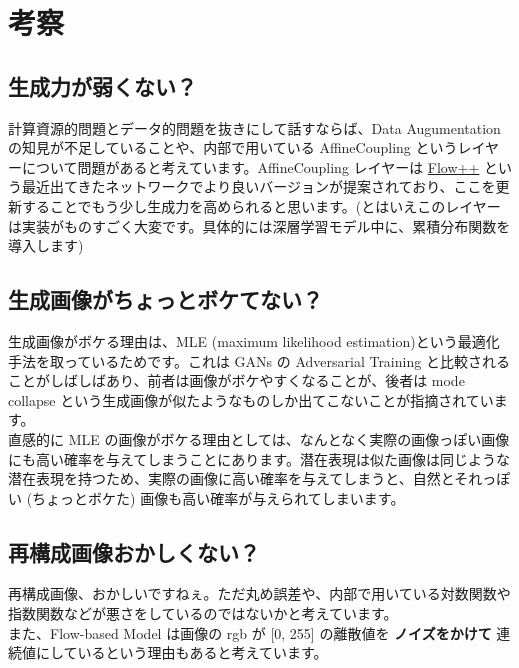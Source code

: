 \documentclass[dvipdfmx]{article}
\begin{document}
\section{考察}
\label{sec:org8e87b73}
\subsection{生成力が弱くない？}
\label{sec:org575711b}
計算資源的問題とデータ的問題を抜きにして話すならば、Data Augumentation の知見が不足していることや、内部で用いている AffineCoupling というレイヤーについて問題があると考えています。AffineCoupling レイヤーは \href{https://arxiv.org/pdf/1902.00275.pdf}{Flow++} という最近出てきたネットワークでより良いバージョンが提案されており、ここを更新することでもう少し生成力を高められると思います。(とはいえこのレイヤーは実装がものすごく大変です。具体的には深層学習モデル中に、累積分布関数を導入します)\\

\subsection{生成画像がちょっとボケてない？}
\label{sec:org31fdf4e}
生成画像がボケる理由は、MLE (maximum likelihood estimation)という最適化手法を取っているためです。これは GANs の Adversarial Training と比較されることがしばしばあり、前者は画像がボケやすくなることが、後者は mode collapse という生成画像が似たようなものしか出てこないことが指摘されています。\\

直感的に MLE の画像がボケる理由としては、なんとなく実際の画像っぽい画像にも高い確率を与えてしまうことにあります。潜在表現は似た画像は同じような潜在表現を持つため、実際の画像に高い確率を与えてしまうと、自然とそれっぽい (ちょっとボケた) 画像も高い確率が与えられてしまいます。\\

\subsection{再構成画像おかしくない？}
\label{sec:orgaf7ab16}
再構成画像、おかしいですねぇ。ただ丸め誤差や、内部で用いている対数関数や指数関数などが悪さをしているのではないかと考えています。\\
また、Flow-based Model は画像の rgb が [0, 255] の離散値を \textbf{ノイズをかけて} 連続値にしているという理由もあると考えています。\\
\end{document}
